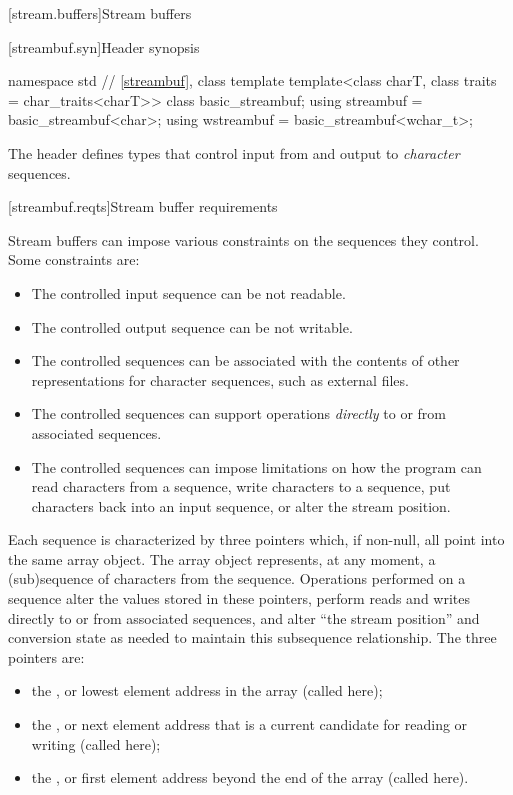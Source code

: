 [stream.buffers]{Stream buffers}

[streambuf.syn]{Header  synopsis}

%
%
%
%
%
\begin{codeblock}
namespace std {
  // \ref{streambuf}, class template 
  template<class charT, class traits = char_traits<charT>>
    class basic_streambuf;
  using streambuf  = basic_streambuf<char>;
  using wstreambuf = basic_streambuf<wchar_t>;
}
\end{codeblock}

\pnum
The header 
defines types that control input from and output to
\textit{character} sequences.

[streambuf.reqts]{Stream buffer requirements}

\pnum
Stream buffers can impose various constraints on the sequences they control.
Some constraints are:
\begin{itemize}
\item
The controlled input sequence can be not readable.
\item
The controlled output sequence can be not writable.
\item
The controlled sequences can be associated with the contents of other
representations for character sequences, such as external files.
\item
The controlled sequences can support operations
\textit{directly}
to or from associated sequences.
\item
The controlled sequences can impose limitations on how the program can
read characters from a sequence,
write characters to a sequence,
put characters back into an input sequence, or
alter the stream position.
\end{itemize}

\pnum
Each sequence is characterized by three pointers which, if non-null,
all point into the same
array object.
The array object represents, at any moment,
a (sub)sequence of characters from the sequence.
Operations performed on a sequence alter the values stored in these pointers,
perform reads and writes directly to or from associated sequences, and
alter ``the stream position'' and conversion state as needed to
maintain this subsequence relationship.
The three pointers are:
\begin{itemize}
\item
the
,
or lowest element address in the array
(called  here);
\item
the
,
or next element address that is a current
candidate for reading or writing (called  here);
\item
the
,
or first element address beyond the end of
the array (called  here).
\end{itemize}

